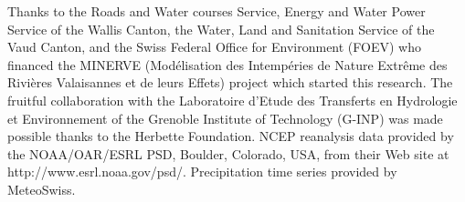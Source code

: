 \documentclass{ametsoc}
\begin{document}
Thanks to the Roads and Water courses Service, Energy and Water Power Service of the Wallis Canton, the Water, Land and Sanitation Service of the Vaud Canton, and the Swiss Federal Office for Environment (FOEV) who financed the MINERVE (Mod\'{e}lisation des Intemp\'{e}ries de Nature Extr\^{e}me des Rivi\`{e}res Valaisannes et de leurs Effets) project which started this research. The fruitful collaboration with the Laboratoire d'Etude des Transferts en Hydrologie et Environnement of the Grenoble Institute of Technology (G-INP) was made possible thanks to the Herbette Foundation. NCEP reanalysis data provided by the NOAA/OAR/ESRL PSD, Boulder, Colorado, USA, from their Web site at http://www.esrl.noaa.gov/psd/. Precipitation time series provided by MeteoSwiss. 


%






%
%
%


\end{document}
